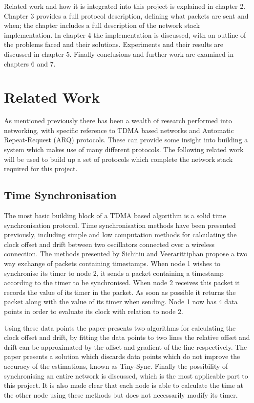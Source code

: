 \documentclass[parskip]{cs4rep}
\begin{document}
Related work and how it is integrated into this project is explained in chapter 2. Chapter 3 provides a full protocol description, defining what packets are sent and when; the chapter includes a full description of the network stack implementation. In chapter 4 the implementation is discussed, with an outline of the problems faced and their solutions. Experiments and their results are discussed in chapter 5. Finally conclusions and further work are examined in chapters 6 and 7.

\chapter{Related Work}

As mentioned previously there has been a wealth of research performed into networking, with specific reference to TDMA based networks and Automatic Repeat-Request (ARQ) protocols. These can provide some insight into building a system which makes use of many different protocols.  The following related work will be used to build up a set of protocols which complete the network stack required for this project.

\section{Time Synchronisation}

The most basic building block of a TDMA based algorithm is a solid time synchronisation protocol. Time synchronisation methods have been presented previously, including simple and low computation methods for calculating the clock offset and drift between two oscillators connected over a wireless connection. The methods presented by Sichitiu and Veerarittiphan \cite{PR1} propose a two way exchange of packets containing timestamps. When node 1 wishes to synchronise its timer to node 2, it sends a packet containing a timestamp according to the timer to be synchronised. When node 2 receives this packet it records the value of its timer in the packet. As soon as possible it returns the packet along with the value of its timer when sending. Node 1 now has 4 data points in order to evaluate its clock with relation to node 2.

Using these data points the paper presents two algorithms for calculating the clock offset and drift, by fitting the data points to two lines the relative offset and drift can be approximated by the offset and gradient of the line respectively. The paper presents a solution which discards data points which do not improve the accuracy of the estimations, known as Tiny-Sync. Finally the possibility of synchronising an entire network is discussed, which is the most applicable part to this project. It is also made clear that each node is able to calculate the time at the other node using these methods but does not necessarily modify its timer.
\end{document}
